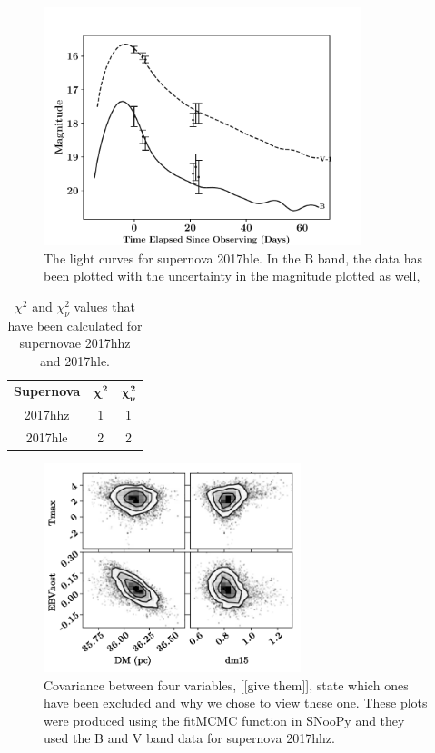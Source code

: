 \documentclass[twocolumn]{revtex4}
\begin{document}
\begin{figure}[!h]
\begin{center}
\includegraphics[width=9.25cm]{results/2017hle}
\caption[]{The light curves for supernova 2017hle. In the B band, the data has been plotted with the uncertainty in the magnitude plotted as well, }
\label{2017hle-data}
\end{center}
\end{figure}

\begin{table}[h!]
\centering
\begin{tabular}{c@{\hskip 20pt}c@{\hskip 20pt}c} 
 \hline
 \textbf{Supernova} & \textbf{$\boldsymbol{\chi^2}$} & \textbf{$\boldsymbol{\chi^2_{\nu}}$} \\ [0.5ex] 
 2017hhz & 1 & 1 \\
 2017hle & 2 & 2 \\
 \hline
\end{tabular}
\caption{$\chi^2$ and $\chi^2_{\nu}$ values that have been calculated for supernovae 2017hhz and 2017hle.}
\label{chi2-table}
\end{table}

\begin{figure}[!h]
\begin{center}
\includegraphics[width=7.5cm]{results/covariance/covariance}
\caption[]{Covariance between four variables, [[give them]], state which ones have been excluded and why we chose to view these one. These plots were produced using the fitMCMC function in SNooPy and they used the B and V band data for supernova 2017hhz.}
\label{2017hle-data}
\end{center}
\end{figure}
\end{document}
